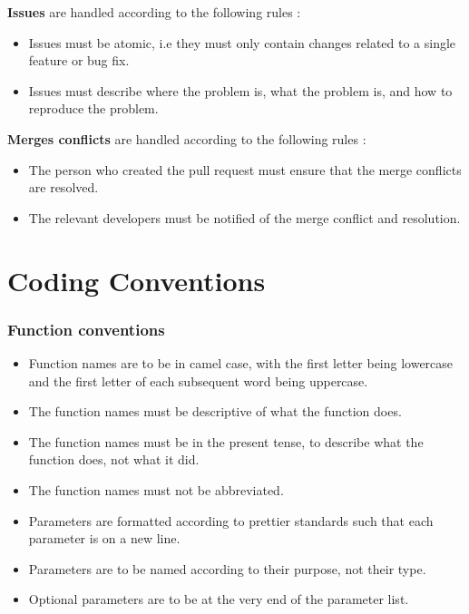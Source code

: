 \documentclass[11pt,a4paper]{article}
\begin{document}
\textbf{Issues} are handled according to the following rules : 
\begin{itemize}
    \item[\textbullet] Issues must be atomic, i.e they must only contain changes related to a single feature or bug fix.
    \item[\textbullet] Issues must describe where the problem is, what the problem is, and how to reproduce the problem.
\end{itemize}

\textbf{Merges conflicts} are handled according to the following rules : 
\begin{itemize}
    \item[\textbullet] The person who created the pull request must ensure that the merge conflicts are resolved.
    \item[\textbullet] The relevant developers must be notified of the merge conflict and resolution.
\end{itemize}


\section*{Coding Conventions}

\subsubsection*{Function conventions}

\begin{itemize}
    \item[\textbullet] Function names are to be in camel case, with the first letter being lowercase and the first letter of each subsequent word being uppercase.
    \item[\textbullet] The function names must be descriptive of what the function does.
    \item[\textbullet] The function names must be in the present tense, to describe what the function does, not what it did.
    \item[\textbullet] The function names must not be abbreviated.
    \item[\textbullet] Parameters are formatted according to prettier standards such that each parameter is on a new line.
    \item[\textbullet] Parameters are to be named according to their purpose, not their type.
    \item[\textbullet] Optional parameters are to be at the very end of the parameter list.
\end{itemize}
\end{document}
